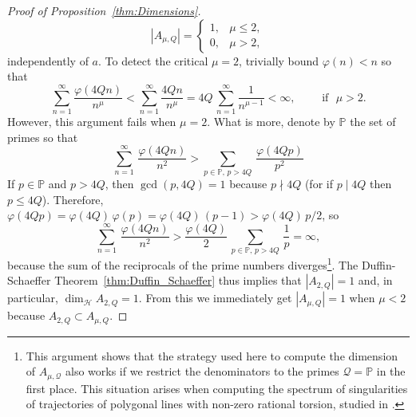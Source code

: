 \documentclass[11pt,reqno]{amsart}
\theoremstyle{definition}
\begin{document}
\begin{proof}[Proof of Proposition~\ref{thm:Dimensions}]
\begin{equation}\label{eq:CaseMu2}
| A_{\mu,Q} | = \left\{  \begin{array}{ll}
1, & \mu \leq 2, \\
0, & \mu > 2, 
\end{array}
\right.
\end{equation}
independently of $a$. 
To detect the critical $\mu=2$, 
trivially bound $\varphi(n) < n$ so that
\begin{equation}
	\sum_{n=1}^\infty \frac{\varphi(4Qn)}{ n^\mu } < \sum_{n=1}^\infty \frac{4Qn}{ n^\mu }
	= 4Q\, \sum_{n=1}^\infty \frac{1}{ n^{\mu-1} } < \infty, \qquad \text{ if } \, \, \mu > 2.
	\end{equation}
However, this argument fails when $\mu = 2$.
What is more, 
denote by $\mathbb P$ the set of primes so that
	\begin{equation}
		\sum_{n=1}^\infty \,  \frac{\varphi(4Qn)}{n^2} >  \sum_{p \in \mathbb P, \, p > 4Q} \,  \frac{\varphi(4Qp)}{p^2}
		\end{equation}		
	If $p \in \mathbb P$ and $p > 4Q$, then $\gcd (p,4Q) = 1$ because $p \nmid 4Q$ (for if $p \mid 4Q$ 		then $p \leq 4Q$). Therefore, $\varphi(4Qp) = \varphi (4Q) \, \varphi(p) = \varphi (4Q) \, (p-1) > \varphi (4Q) \, p/2$, so 
	\begin{equation}
		\sum_{n=1}^\infty \,  \frac{\varphi(4Qn)}{n^2} 
		> \frac{\varphi(4Q)}{2} \, \sum_{p \in \mathbb P, \, p > 4Q} \,  \frac{1}{p} = \infty,
	\end{equation}
	because the sum of the reciprocals of the prime numbers diverges\footnote{
This argument shows that the strategy used here to compute the dimension of $A_{\mu,\mathcal Q}$
also works if we restrict the denominators 
to the primes $\mathcal Q = \mathbb P$ in the first place. This situation arises when computing the spectrum of singularities of trajectories of polygonal lines with non-zero rational torsion, studied in \cite{BanicaVega2022}.}. 
The Duffin-Schaeffer Theorem~\ref{thm:Duffin_Schaeffer} thus implies that $ | A_{2,Q}| = 1$ and,
in particular, $\operatorname{dim}_{\mathcal H} A_{2,Q} = 1$.
From this we immediately get $ | A_{\mu,Q}| = 1$ when $\mu < 2$ because $A_{2,Q} \subset A_{\mu,Q}$.
 



\end{proof}
\end{document}
